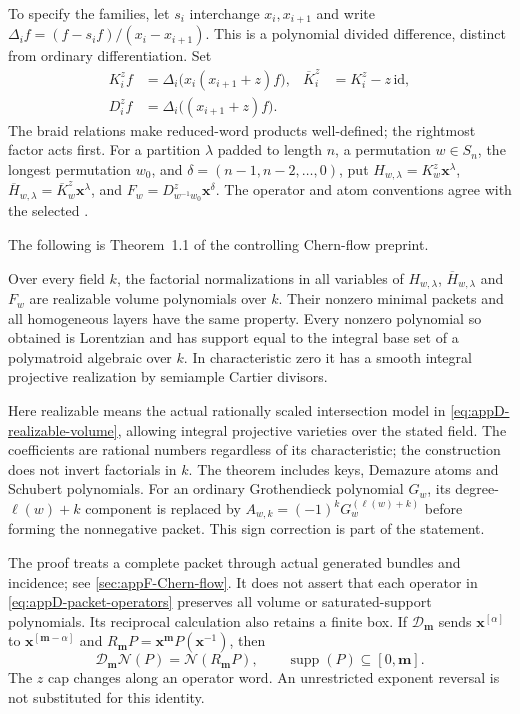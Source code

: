 To specify the families, let $s_i$ interchange $x_i,x_{i+1}$ and
write $\Delta_i f=(f-s_if)/(x_i-x_{i+1})$. This is a polynomial
divided difference, distinct from ordinary differentiation. Set
\[
\begin{aligned}
 K_i^z f&=\Delta_i\bigl(x_i(x_{i+1}+z)f\bigr),&
 \overline K_i^z&=K_i^z-z\,\mathrm{id},\\
 D_i^z f&=\Delta_i\bigl((x_{i+1}+z)f\bigr).&&
\end{aligned}
\tag{D.44}\label{eq:appD-packet-operators}
\]
The braid relations make reduced-word products well-defined;
the rightmost factor acts first. For a partition $\lambda$ padded
to length $n$, a permutation $w\in S_n$, the longest permutation
$w_0$, and $\delta=(n-1,n-2,\ldots,0)$, put
$H_{w,\lambda}=K_w^z\mathbf x^\lambda$,
$\overline H_{w,\lambda}=\overline K_w^z\mathbf x^\lambda$, and
$F_w=D_{w^{-1}w_0}^z\mathbf x^\delta$.
The operator and atom conventions agree with the selected
\cite[\S2]{BuciumasScrimshawWeber20LascouxV2}.

The following is Theorem~1.1 of the controlling Chern-flow preprint.
\begin{theorem}
\label{thm:appD-Chern-packet-volume}
Over every field $k$, the factorial normalizations in all variables of
$H_{w,\lambda}$, $\overline H_{w,\lambda}$ and $F_w$ are realizable
volume polynomials over $k$. Their nonzero minimal packets and all
homogeneous layers have the same property. Every nonzero polynomial
so obtained is Lorentzian and has support equal to the integral base
set of a polymatroid algebraic over $k$. In characteristic zero it has
a smooth integral projective realization by semiample Cartier divisors.
\end{theorem}

Here realizable means the actual rationally scaled intersection
model in \eqref{eq:appD-realizable-volume}, allowing integral
projective varieties over the stated field. The coefficients are
rational numbers regardless of its characteristic; the construction
does not invert factorials in $k$. The theorem includes keys,
Demazure atoms and Schubert polynomials. For an ordinary
Grothendieck polynomial $G_w$, its degree-$\ell(w)+k$ component
is replaced by $A_{w,k}=(-1)^kG_w^{(\ell(w)+k)}$ before forming
the nonnegative packet. This sign correction is part of the statement.

The proof treats a complete packet through actual generated bundles
and incidence; see \cref{sec:appF-Chern-flow}. It does not assert
that each operator in \eqref{eq:appD-packet-operators} preserves
all volume or saturated-support polynomials. Its reciprocal calculation
also retains a finite box. If $\mathcal D_{\mathbf m}$ sends
$\mathbf x^{[\alpha]}$ to $\mathbf x^{[\mathbf m-\alpha]}$ and
$R_{\mathbf m}P=\mathbf x^{\mathbf m}P(\mathbf x^{-1})$, then
\[
 \mathcal D_{\mathbf m}\mathcal N(P)
       =\mathcal N(R_{\mathbf m}P),\qquad
            \operatorname{supp}(P)\subseteq[0,\mathbf m].
\tag{D.45}\label{eq:appD-packet-finite-complement}
\]
The $z$ cap changes along an operator word. An unrestricted
exponent reversal is not substituted for this identity.

